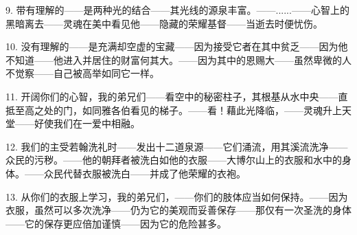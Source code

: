 9. 带有理解的——\newline{}是两种光的结合——\newline{}其光线的源泉丰富。——\newline{}......——\newline{}心智上的黑暗离去——\newline{}灵魂在美中看见他——\newline{}隐藏的荣耀基督——\newline{}当逝去时便忧伤。\par

10. 没有理解的——\newline{}是充满却空虚的宝藏——\newline{}因为接受它者在其中贫乏——\newline{}因为他不知道——\newline{}他进入并居住的财富何其大。——\newline{}因为其中的恩赐大——\newline{}虽然卑微的人不觉察——\newline{}自己被高举如同它一样。\par

11. 开阔你们的心智，我的弟兄们——\newline{}看空中的秘密柱子，其根基从水中央——\newline{}直抵至高之处的门，如同雅各伯看见的梯子。——\newline{}看！藉此光降临，——\newline{}灵魂升上天堂——\newline{}好使我们在一爱中相融。\par

12. 我们的主受若翰洗礼时——\newline{}发出十二道泉源——\newline{}它们涌流，用其溪流洗净——\newline{}众民的污秽。——\newline{}他的朝拜者被洗白如他的衣服——\newline{}大博尔山上的衣服和水中的身体。——\newline{}众民代替衣服被洗白——\newline{}并成了他荣耀的衣袍。\par

13. 从你们的衣服上学习，我的弟兄们，——你们的肢体应当如何保持。——因为衣服，虽然可以多次洗净——仍为它的美观而妥善保存——那仅有一次圣洗的身体——它的保存更应倍加谨慎——因为它的危险甚多。\par

